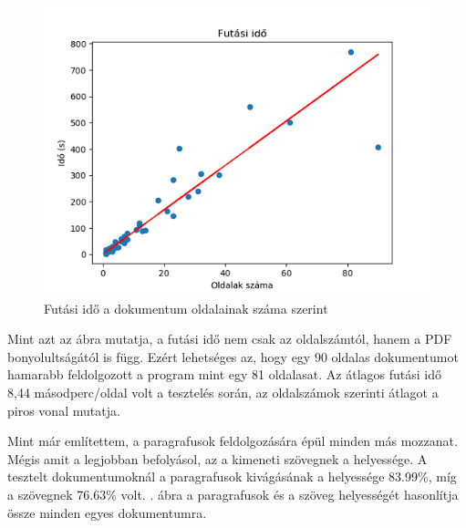 \begin{figure}[h!]
\centering
\includegraphics[scale=1]{images/runtime.png}
\caption{Futási idő a dokumentum oldalainak száma szerint}
\label{fig:runtime}
\end{figure}

Mint azt az ábra mutatja, a futási idő nem csak az oldalszámtól, hanem a PDF bonyolultságától is függ. Ezért lehetséges az, hogy egy 90 oldalas dokumentumot hamarabb feldolgozott a program mint egy 81 oldalasat. Az átlagos futási idő 8,44 másodperc/oldal volt a tesztelés során, az oldalszámok szerinti átlagot a piros vonal mutatja.


Mint már említettem, a paragrafusok feldolgozására épül minden más mozzanat. Mégis amit a legjobban befolyásol, az a kimeneti szövegnek a helyessége. A tesztelt dokumentumoknál a paragrafusok kivágásának a helyessége 83.99\%, míg a szövegnek 76.63\% volt. . ábra a paragrafusok és a szöveg helyességét hasonlítja össze minden egyes dokumentumra.

